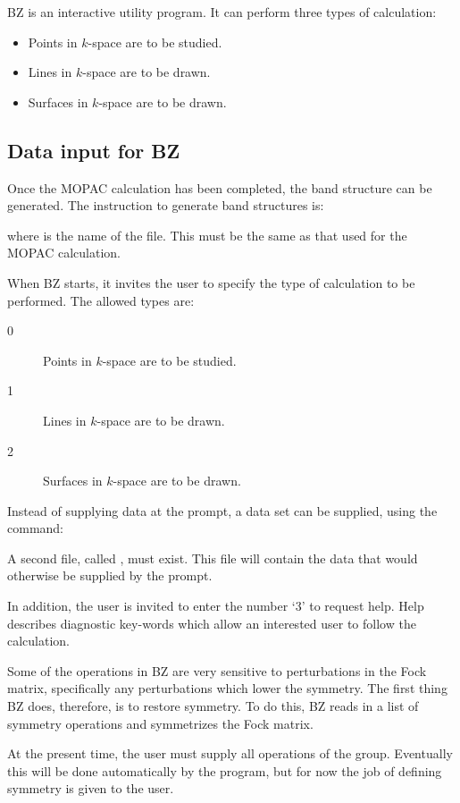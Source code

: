 BZ is an interactive utility program.  It can perform three types of
calculation:
\begin{itemize}
\item  Points in $k$-space are to be studied.
\item  Lines in $k$-space are to be drawn.
\item  Surfaces in $k$-space are to be drawn.
\end{itemize}

\subsection{Data input for BZ}
Once the MOPAC calculation has been completed, the band structure can be
generated. The instruction to generate band structures is:


where  is the name of the file. This must be the same as
that used for the MOPAC calculation.

When BZ starts, it invites the user to specify the type
of calculation to be performed. The allowed types are:
\begin{description}
\item[0] Points in $k$-space are to be studied.
\item[1] Lines in $k$-space are to be drawn.
\item[2] Surfaces in $k$-space are to be drawn.
\end{description}

Instead of supplying data at the prompt, a data set can be supplied, using the
 command:


A second file, called , must exist.  This file will
contain the data that would otherwise be supplied by the prompt.

In addition, the user is invited to enter the number `3' to request help. Help
describes diagnostic key-words which allow an interested user to follow the
calculation.

Some of the operations in BZ are very sensitive to perturbations in the Fock
matrix, specifically any perturbations which lower the symmetry.  The first
thing BZ does, therefore, is to restore symmetry.  To do this, BZ reads in a
list of symmetry operations and symmetrizes the Fock matrix.

At the present time, the user must supply all operations of the group.
Eventually this will be done automatically by the program, but for now the job
of defining symmetry is given to the user.

